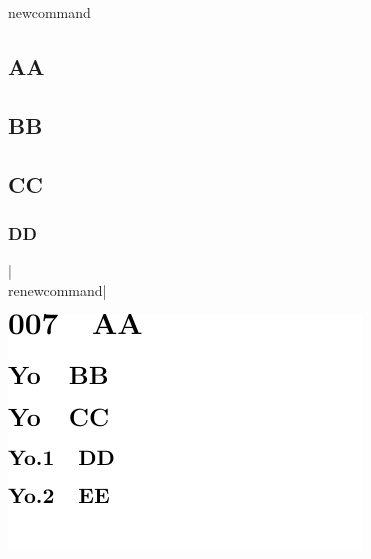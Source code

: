 \begin{saveblock}{newcommand}
	\begin{highlightblock}[gobble=8,linewidth=\textwidth,
		framexleftmargin=0.25em,xleftmargin=0.25em]
        \renewcommand\thesection{007}
        \renewcommand\thesubsection{Yo}
        \section{AA}
        \subsection{BB}
        \subsection{CC}
        \subsubsection{DD}
	\end{highlightblock}
\end{saveblock}

\bgroup

\begin{frame}{\hll|\\renewcommand|}

    \medskip

    \centering
    \includegraphics[width=\linewidth,height=0.4\textheight,keepaspectratio]{
		assets/internals-renewcommand-output.pdf}
\end{frame}
\egroup
